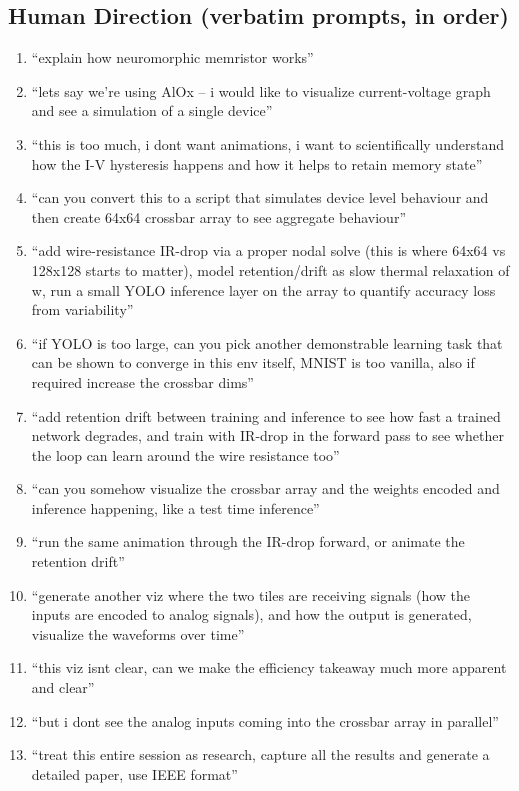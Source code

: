 \subsection{Human Direction (verbatim prompts, in order)}
\begin{enumerate}
\item ``explain how neuromorphic memristor works''
\item ``lets say we're using AlOx -- i would like to visualize current-voltage
graph and see a simulation of a single device''
\item ``this is too much, i dont want animations, i want to scientifically
understand how the I-V hysteresis happens and how it helps to retain memory
state''
\item ``can you convert this to a script that simulates device level behaviour
and then create 64x64 crossbar array to see aggregate behaviour''
\item ``add wire-resistance IR-drop via a proper nodal solve (this is where 64x64
vs 128x128 starts to matter), model retention/drift as slow thermal relaxation of
w, run a small YOLO inference layer on the array to quantify accuracy loss from
variability''
\item ``if YOLO is too large, can you pick another demonstrable learning task
that can be shown to converge in this env itself, MNIST is too vanilla, also if
required increase the crossbar dims''
\item ``add retention drift between training and inference to see how fast a
trained network degrades, and train with IR-drop in the forward pass to see
whether the loop can learn around the wire resistance too''
\item ``can you somehow visualize the crossbar array and the weights encoded and
inference happening, like a test time inference''
\item ``run the same animation through the IR-drop forward, or animate the
retention drift''
\item ``generate another viz where the two tiles are receiving signals (how the
inputs are encoded to analog signals), and how the output is generated, visualize
the waveforms over time''
\item ``this viz isnt clear, can we make the efficiency takeaway much more
apparent and clear''
\item ``but i dont see the analog inputs coming into the crossbar array in
parallel''
\item ``treat this entire session as research, capture all the results and
generate a detailed paper, use IEEE format''
\end{enumerate}


